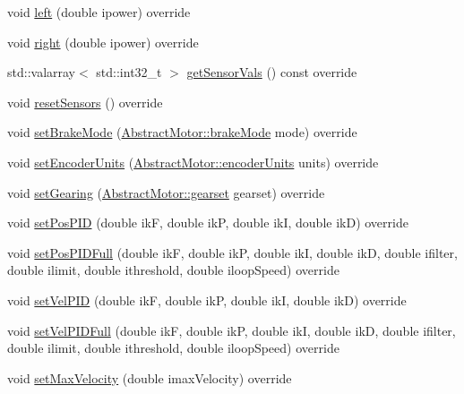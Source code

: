 \begin{DoxyCompactItemize}
\item 
void \mbox{\hyperlink{classokapi_1_1XDriveModel_a0a4688df022b66164e81709e6eaa02e5}{left}} (double ipower) override
\item 
void \mbox{\hyperlink{classokapi_1_1XDriveModel_a21bc8f93cda3b0b58ec6543a6dc02c24}{right}} (double ipower) override
\item 
std\+::valarray$<$ std\+::int32\+\_\+t $>$ \mbox{\hyperlink{classokapi_1_1XDriveModel_a3beef170f1e7fd988d815f335cafad1e}{get\+Sensor\+Vals}} () const override
\item 
void \mbox{\hyperlink{classokapi_1_1XDriveModel_adbc23b11cde6aebb3c7eefb1f0251af7}{reset\+Sensors}} () override
\item 
void \mbox{\hyperlink{classokapi_1_1XDriveModel_a27356e54c9fd0361d01de4c81ff851e7}{set\+Brake\+Mode}} (\mbox{\hyperlink{classokapi_1_1AbstractMotor_a132e0485dbb59a60c3f934338d8fa601}{Abstract\+Motor\+::brake\+Mode}} mode) override
\item 
void \mbox{\hyperlink{classokapi_1_1XDriveModel_a56b590280c856259ad710e888d8e215c}{set\+Encoder\+Units}} (\mbox{\hyperlink{classokapi_1_1AbstractMotor_ae811cd825099f2defadeb1b7f7e7764c}{Abstract\+Motor\+::encoder\+Units}} units) override
\item 
void \mbox{\hyperlink{classokapi_1_1XDriveModel_ae9205c16e581786fecabaeb5066edab6}{set\+Gearing}} (\mbox{\hyperlink{classokapi_1_1AbstractMotor_a88aaa6ea2fa10f5520a537bbf26774d5}{Abstract\+Motor\+::gearset}} gearset) override
\item 
void \mbox{\hyperlink{classokapi_1_1XDriveModel_ad3769e5e46350c07665563e7acad2ad4}{set\+Pos\+P\+ID}} (double ikF, double ikP, double ikI, double ikD) override
\item 
void \mbox{\hyperlink{classokapi_1_1XDriveModel_a1b9375f95eee0633ce9ba21ac459074c}{set\+Pos\+P\+I\+D\+Full}} (double ikF, double ikP, double ikI, double ikD, double ifilter, double ilimit, double ithreshold, double iloop\+Speed) override
\item 
void \mbox{\hyperlink{classokapi_1_1XDriveModel_a556be85eb445580508a1322407c78a7a}{set\+Vel\+P\+ID}} (double ikF, double ikP, double ikI, double ikD) override
\item 
void \mbox{\hyperlink{classokapi_1_1XDriveModel_aa52cd97a543855a10728a956ed5f17a0}{set\+Vel\+P\+I\+D\+Full}} (double ikF, double ikP, double ikI, double ikD, double ifilter, double ilimit, double ithreshold, double iloop\+Speed) override
\item 
void \mbox{\hyperlink{classokapi_1_1XDriveModel_aec91f0569213bbca770ad4a25529beb6}{set\+Max\+Velocity}} (double imax\+Velocity) override

\end{DoxyCompactItemize}
